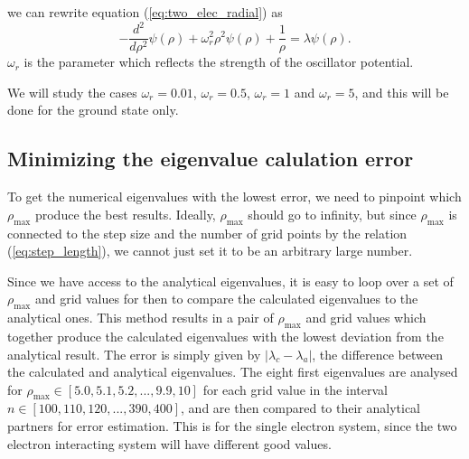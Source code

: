 \documentclass{emulateapj}
\begin{document}
        we can rewrite equation (\ref{eq:two_elec_radial}) as
        \begin{equation*}
            -\dfrac{d^2}{d\rho^2} \psi(\rho) + \omega_r^2 \rho^2 \psi(\rho) + \dfrac{1}{\rho} = \lambda \psi(\rho).
        \end{equation*}
        $\omega_r$ is the parameter which reflects the strength of the oscillator potential.
        
        We will study the cases $\omega_r = 0.01$, $\omega_r = 0.5$, $\omega_r = 1$ and $\omega_r = 5$, and this will be done for the ground state only.
    \subsection{\textbf{Minimizing the eigenvalue calulation error}}
    \label{seq:minimize_eigenvalue}
        To get the numerical eigenvalues with the lowest error, we need to pinpoint which $\rho_{\text{max}}$ produce the best results. Ideally, $\rho_{\text{max}}$ should go to infinity, but since $\rho_{\text{max}}$ is connected to the step size and the number of grid points by the relation (\ref{eq:step_length}), we cannot just set it to be an arbitrary large number. 
        
        Since we have access to the analytical eigenvalues, it is easy to loop over a set of $\rho_{\text{max}}$ and grid values for then to compare the calculated eigenvalues to the analytical ones. This method results in a pair of $\rho_{\text{max}}$ and grid values which together produce the calculated eigenvalues with the lowest deviation from the analytical result. The error is simply given by $|\lambda_c - \lambda_a|$, the difference between the calculated and analytical eigenvalues. The eight first eigenvalues are analysed for $\rho_{\text{max}} \in [5.0, 5.1, 5.2, ..., 9.9, 10]$ for each grid value in the interval $n \in [100, 110, 120, ..., 390, 400]$, and are then compared to their analytical partners for error estimation. This is for the single electron system, since the two electron interacting system will have different good values.
        
\end{document}
